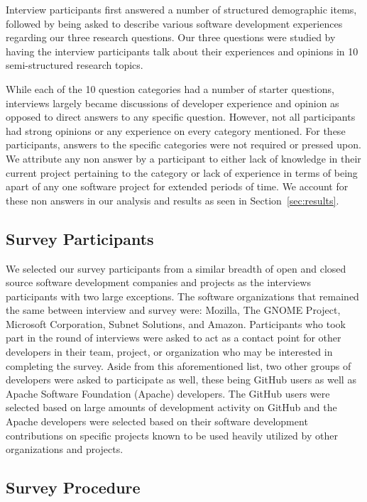 \documentclass[conference]{IEEEtran}
\newcommand{\totalCategories}{10}
\begin{document}
Interview participants first answered a number of structured demographic items, followed by being  
asked to describe various software development experiences regarding our three research questions.
Our three questions were studied by having the interview participants talk about their experiences and opinions in
\totalCategories{} semi-structured research topics.

While each of the \totalCategories{} question categories had a number of starter questions, interviews 
largely became discussions of developer experience and opinion as opposed to direct answers to any specific question.
However, not all participants had strong opinions or any experience on every category mentioned. For these participants, answers 
to the specific categories were not required or pressed upon. We attribute any non answer by a participant to
either lack of knowledge in their current project pertaining to the category or lack of experience in terms of
being apart of any one software project for extended periods of time. We account for these non answers
in our analysis and results as seen in Section~\ref{sec:results}.

\subsection{Survey Participants}

We selected our survey participants from a similar breadth of open and closed source software development 
companies and projects as the interviews participants with two large exceptions. The software organizations
that remained the same between interview and survey were: Mozilla, The GNOME Project, Microsoft Corporation, 
Subnet Solutions, and Amazon.
Participants who took part in the round of interviews were asked to act as a contact point for other 
developers in their team, project, or organization who may be interested
in completing the survey. Aside from this aforementioned list, two other groups of developers were asked to
participate as well, these being GitHub users as well as Apache Software Foundation (Apache) developers. The GitHub
users were selected based on large amounts of development activity on GitHub and the Apache developers
were selected based on their software development contributions on specific projects known to be used heavily
utilized by other organizations and projects.

\subsection{Survey Procedure}
\end{document}
